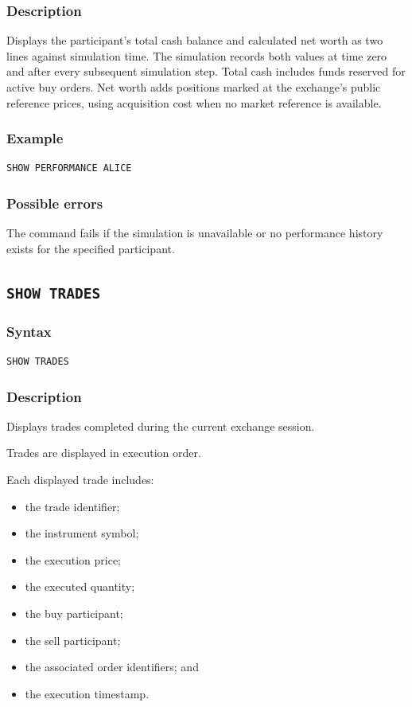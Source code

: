 \documentclass{article}
\begin{document}
\subsubsection*{Description}

Displays the participant's total cash balance and calculated net worth as two
lines against simulation time. The simulation records both values at time zero
and after every subsequent simulation step. Total cash includes funds reserved
for active buy orders. Net worth adds positions marked at the exchange's public
reference prices, using acquisition cost when no market reference is available.

\subsubsection*{Example}

\begin{lstlisting}
SHOW PERFORMANCE ALICE
\end{lstlisting}

\subsubsection*{Possible errors}

The command fails if the simulation is unavailable or no performance history
exists for the specified participant.

\subsection{\texttt{SHOW TRADES}}

\subsubsection*{Syntax}

\begin{lstlisting}
SHOW TRADES
\end{lstlisting}

\subsubsection*{Description}

Displays trades completed during the current exchange session.

Trades are displayed in execution order.

Each displayed trade includes:

\begin{itemize}
    \item the trade identifier;
    \item the instrument symbol;
    \item the execution price;
    \item the executed quantity;
    \item the buy participant;
    \item the sell participant;
    \item the associated order identifiers; and
    \item the execution timestamp.
\end{itemize}
\end{document}
